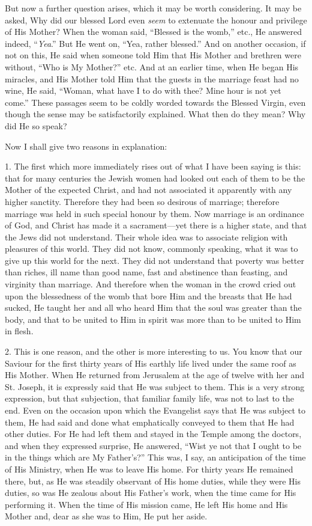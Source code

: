 But now a further question arises, which it may
be worth considering. It may be asked, Why did our blessed Lord even \emph{seem}
to extenuate the honour and privilege of His Mother? When the woman
said, ``Blessed is the womb,'' etc., He answered indeed, ``\emph{Yea}.''
But He went on, ``Yea, rather blessed.'' And on another occasion, if not
on this, He said when someone told Him that His Mother and brethren
were without, ``Who is My Mother?'' etc. And at an earlier time, when He
began His miracles, and His Mother told Him that the guests in the
marriage feast had no wine, He said, ``Woman, what have I to do with
thee? Mine hour is not yet come.'' These passages seem to be coldly
worded towards the Blessed Virgin, even though the sense may be
satisfactorily explained. What then do they mean? Why did He so speak?

Now I shall give two reasons in explanation:

1. The first which more immediately rises out of
what I have been saying is this: that for many centuries the Jewish
women had looked out each of them to be the Mother of the expected
Christ, and had not associated it apparently with any higher sanctity.
Therefore they had been so desirous of marriage; therefore marriage
was held in such special honour by them. Now marriage is an ordinance
of God, and Christ has made it a sacrament—yet there is a higher
state, and that the Jews did not understand. Their whole idea was to
associate religion with pleasures of this world. They did not
know, commonly speaking, what it was to give up this world for the
next. They did not understand that poverty was better than riches, ill
name than good name, fast and abstinence than feasting, and virginity
than marriage. And therefore when the woman in the crowd cried out
upon the blessedness of the womb that bore Him and the breasts that He
had sucked, He taught her and all who heard Him that the soul was
greater than the body, and that to be united to Him in spirit was more
than to be united to Him in flesh.

2. This is one reason, and the other is more
interesting to us. You know that our Saviour for the first thirty
years of His earthly life lived under the same roof as His Mother.
When He returned from Jerusalem at the age of twelve with her and St.
Joseph, it is expressly said that He was subject to them. This is a
very strong expression, but that subjection, that familiar family
life, was not to last to the end. Even on the occasion upon which the
Evangelist says that He was subject to them, He had said and done what
emphatically conveyed to them that He had other duties. For He had
left them and stayed in the Temple among the doctors, and when they
expressed surprise, He answered, ``Wist ye not that I ought to be
in the things which are My Father's?'' This was, I say, an anticipation
of the time of His Ministry, when He was to leave His home. For thirty
years He remained there, but, as He was steadily observant of His
home duties, while they were His duties, so was He zealous about His
Father's work, when the time came for His performing it. When the time
of His mission came, He left His home and His Mother and, dear as she
was to Him, He put her aside.


